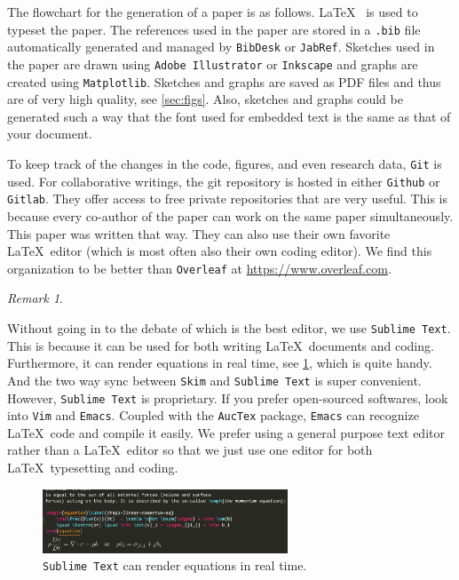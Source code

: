 \documentclass[authoryear,3p,times,preprint,review,fleqn]{elsarticle}
\numberwithin{equation}{section}
\theoremstyle{remark}
\newtheorem{rmk}{Remark}
\begin{document}
The flowchart for the generation of a paper is as follows. \LaTeX~ is used to typeset the paper. The references used in the paper are stored in a \texttt{.bib} file automatically generated and managed by \texttt{BibDesk} or \texttt{JabRef}. Sketches used in the paper are drawn using \texttt{Adobe Illustrator} or \texttt{Inkscape} and graphs are created using \texttt{Matplotlib}. Sketches and graphs are saved as PDF files and thus are of very high quality, see \cref{sec:figs}. Also, sketches and graphs could be generated such a way that the font used for embedded text is the same as that of your document.


To keep track of the changes in the code, figures, and even research data, \texttt{Git} is used. For collaborative writings, the git repository is hosted in either \texttt{Github} or \texttt{Gitlab}. They offer access to free private repositories that are very useful. This is because every co-author of the paper can work on the same paper simultaneously. This paper was written that way. 
They can also use their own favorite \LaTeX\ editor (which is most often also their own coding editor). We find this organization to be better than \texttt{Overleaf} at \url{https://www.overleaf.com}.





\begin{rmk}\label{rm:a}

Without going in to the debate of which is the best editor, we use \texttt{Sublime Text}. This is
because it can be used for both writing \LaTeX\ documents and coding. Furthermore, it can render equations in real time, see  \cref{fig:sublime-text}, which is quite handy. And the two way sync between \texttt{Skim} and \texttt{Sublime Text} is super convenient. However, \texttt{Sublime Text} is proprietary. If you prefer open-sourced softwares, look into \texttt{Vim} and \texttt{Emacs}. Coupled with the \texttt{AucTex} package, \texttt{Emacs} can recognize \LaTeX\ code and compile it easily. We prefer using a general purpose text editor rather than a \LaTeX\ editor so that we just use one editor  for both \LaTeX\ typesetting and coding. 


\begin{figure}[h!]
  \centering 
   \includegraphics[width=0.65\textwidth]{sublime-text}
   \caption{\texttt{Sublime Text} can render equations in real time.}
\label{fig:sublime-text}
\end{figure}
\end{rmk}
\end{document}
